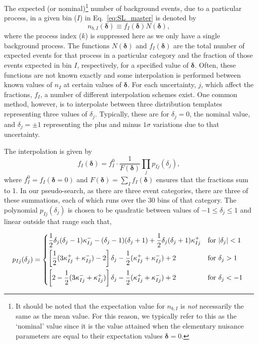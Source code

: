 \documentclass[11pt]{article}
\begin{document}
The expected (or nominal)\footnote{It should be noted that the expectation value for $n_{b,I}$ is \emph{not} necessarily the same as the mean value. For this reason, we typically refer
to this as the `nominal' value since it is the value attained when the elementary nuisance parameters are equal to their expectation values $\mathbf{\delta}=0$.} number of background events, due to a particular process, in a given bin ($I$) in %
Eq.~\eqref{eq:SL_master} is denoted by
%
\begin{equation}
  n_{b,I}(\bm{\delta}) \equiv %
  f_{I}(\bm{\delta}) N(\bm{\delta}),
\end{equation}
%
where the process index ($k$) is suppressed here as we only have a single background process. The functions $N(\bm{\delta})$ and  $f_{I}(\bm{\delta})$ are the total number of expected events for that process in a particular
category and the fraction of those events expected in bin $I$, respectively, for a specified value of $\bm{\delta}$. Often, these functions are not known exactly and some interpolation is performed between known
values of $n_{I}$ at certain values of $\bm{\delta}$. For each uncertainty, $j$, which affect the fractions, $f_{I}$, a number of different interpolation schemes exist. One common method, however, is to interpolate between
three distribution templates representing three values of $\delta_{j}$. Typically, these are for $\delta_{j}=0$, the nominal value, and $\delta_{j}=\pm1$ representing the plus and minus $1\sigma$ variations due to that uncertainty.

The interpolation is given by
%
\begin{equation}
 f_{I}(\bm{\delta}) = f_{I}^{0}\cdot\frac{1}{F(\bm{\delta})} \prod_{j} p_{Ij}(\delta_{j}),
 \label{eqn:frac_function}
\end{equation}
%
where $f_{I}^{0}=f_{I}(\bm{\delta}=0)$ and $F(\bm{\delta})=\sum_{I}f_{I}(\bm{\delta})$ ensures that the fractions sum to 1. In our pseudo-search, as there are three event categories,
there are three of these summations, each of which runs over the 30 bins of that category. The polynomial $p_{Ij}(\delta_{j})$ is chosen to be quadratic between values of $-1 \leq \delta_{j} \leq 1$
and linear outside that range such that,

\begin{equation}
 p_{Ij}(\delta_{j}) = \begin{dcases*}
 		\frac{1}{2} \delta_{j}(\delta_{j}-1) \kappa_{Ij}^{-}  -(\delta_{j}-1)(\delta_{j}+1) + \frac{1}{2}\delta_{j}(\delta_{j}+1)\kappa_{Ij}^{+} & for $|\delta_{j}|<1$ \\
        \left[ \frac{1}{2}(3\kappa_{Ij}^{+} + \kappa_{Ij}^{-})-2\right]\delta_{j} - \frac{1}{2}(\kappa_{Ij}^{+}+\kappa_{Ij}^{-})+2 & for $\delta_{j}>1$ \\
         \left[2-\frac{1}{2}(3\kappa_{Ij}^{-} + \kappa_{Ij}^{+})\right]\delta_{j} - \frac{1}{2}(\kappa_{Ij}^{+}+\kappa_{Ij}^{-})+2 & for $\delta_{j}<-1$ \\
    \end{dcases*}
\end{equation}
\end{document}
